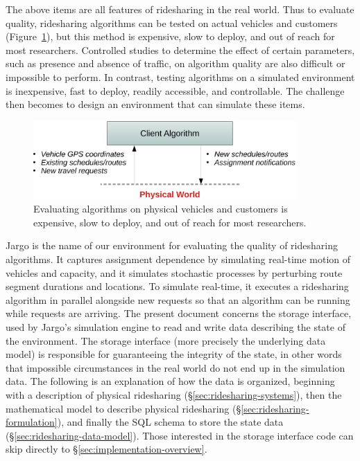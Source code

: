 \documentclass{article}
\theoremstyle{definition}
\begin{document}
The above items are all features of ridesharing in the real world.  Thus to
evaluate quality, ridesharing algorithms can be tested on actual vehicles and
customers (Figure~\ref{fig:physical}), but this method is expensive, slow to
deploy, and out of reach for most researchers. Controlled studies to determine
the effect of certain parameters, such as presence and absence of traffic, on
algorithm quality are also difficult or impossible to perform. In contrast,
testing algorithms on a simulated environment is inexpensive, fast to deploy,
readily accessible, and controllable. The challenge then becomes to design an
environment that can simulate these items.

\begin{figure}[h]
\centering
\includegraphics[width=100mm]{src/fig/physical}
\caption{Evaluating algorithms on physical vehicles and customers is expensive,
    slow to deploy, and out of reach for most researchers.}
\label{fig:physical}
\end{figure}

Jargo is the name of our environment for evaluating the quality of ridesharing
algorithms. It captures assignment dependence by simulating real-time motion of
vehicles and capacity, and it simulates stochastic processes by perturbing
route segment durations and locations. To simulate real-time, it executes a
ridesharing algorithm in parallel alongside new requests so that an algorithm
can be running while requests are arriving. The present document concerns the
storage interface, used by Jargo's simulation engine to read and write data
describing the state of the environment. The storage interface (more precisely
the underlying data model) is responsible for guaranteeing the integrity of the
state, in other words that impossible circumstances in the real world do not
end up in the simulation data. The following is an explanation of how the data
is organized, beginning with a description of physical ridesharing
(\S\ref{sec:ridesharing-systems}), then the mathematical model to describe
physical ridesharing (\S\ref{sec:ridesharing-formulation}), and finally the
SQL schema to store the state data (\S\ref{sec:ridesharing-data-model}).  Those interested
in the storage interface code can skip directly to
\S\ref{sec:implementation-overview}.
\end{document}
